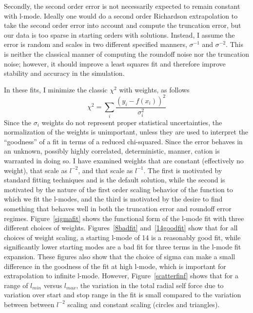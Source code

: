 Secondly, the second order error is not necessarily expected to remain constant with l-mode. Ideally one would do a second order Richardson extrapolation to take the second order error into account and compute the truncation error, but our data is too sparse in starting orders with solutions. Instead, I assume the error is random and scales in two different specified manners, $\sigma^{-1}$ and $\sigma^{-2}$. This is neither the classical manner of computing the roundoff noise nor the truncation noise; however, it should improve a least squares fit and therefore improve stability and accuracy in the simulation.  

In these fits, I minimize the classic $\chi^2$ with weights, as follows
\begin{equation}
\chi^2=\sum_i \frac{(y_i-f(x_i))^2}{\sigma_i^2}
\end{equation}
Since the $\sigma_i$ weights do not represent proper statistical uncertainties, the normalization of the weights is unimportant, unless they are used to interpret the ``goodness'' of a fit in terms of a reduced chi-squared. Since the error behaves in an unknown, possibly highly correlated, deterministic, manner, cation is warranted in doing so. I have examined weights that are constant (effectively no weight), that  scale as $l^{-2}$, and that scale as $l^{-1}$. The first is motivated by standard fitting techniques and is the default solution, while the second is motivated by the nature of the first order scaling behavior of the function to which we fit the l-modes, and the third is motivated by the desire to find something that behaves well in both the truncation error and roundoff error regimes. Figure~\ref{sigmafit} shows the functional form of the l-mode fit with three different choices of weights. Figures~\ref{8badfit} and~\ref{14goodfit} show that for all choices of weight scaling, a starting l-mode of 14 is a reasonably good fit, while significantly lower starting modes are a bad fit for three terms in the l-mode fit expansion. These figures also show that the choice of sigma can make a small difference in the goodness of the fit at high l-mode, which is important for extrapolation to infinite l-mode. However, Figure~\ref{scatterfinf} shows that for a range of $l_{min}$ versus $l_{max}$, the variation in the total radial self force due to variation over start and stop range in the fit is small compared to the variation between between $l^{-2}$ scaling and constant scaling (circles and triangles). 

